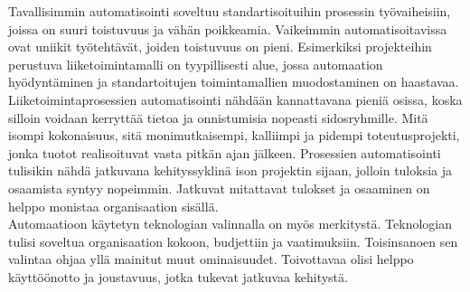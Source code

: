 \documentclass[finnish,12pt,a4paper,pdftex]{article}
\begin{document}
Tavallisimmin automatisointi soveltuu standartisoituihin prosessin työvaiheisiin, joissa on suuri toistuvuus ja vähän poikkeamia. Vaikeimmin automatisoitavissa ovat uniikit työtehtävät, joiden toistuvuus on pieni. Esimerkiksi projekteihin perustuva liiketoimintamalli on tyypillisesti alue, jossa automaation hyödyntäminen ja standartoitujen toimintamallien muodostaminen on haastavaa.  \citep{teollisuustalous}\\

\noindent Liiketoimintaprosessien automatisointi nähdään kannattavana pieniä osissa, koska silloin voidaan kerryttää tietoa ja onnistumisia nopeasti sidosryhmille. Mitä isompi kokonaisuus, sitä monimutkaisempi, kalliimpi ja pidempi toteutusprojekti, jonka tuotot realisoituvat vasta pitkän ajan jälkeen. Prosessien automatisointi tulisikin nähdä jatkuvana kehityssyklinä ison projektin sijaan, jolloin tuloksia ja osaamista syntyy nopeimmin. Jatkuvat mitattavat tulokset ja osaaminen on helppo monistaa organisaation sisällä. \citep{clarkin}\\

\noindent Automaatioon käytetyn teknologian valinnalla on myös merkitystä. Teknologian tulisi soveltua organisaation kokoon, budjettiin ja vaatimuksiin. Toisinsanoen sen valintaa ohjaa yllä mainitut muut ominaisuudet. Toivottavaa olisi helppo käyttöönotto ja joustavuus, jotka tukevat jatkuvaa kehitystä. \citep{mohapatra}




\end{document}
